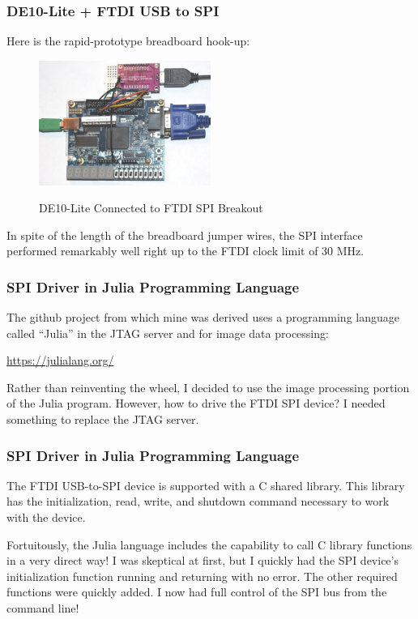 \documentclass{beamer}
\begin{document}
\begin{frame}
\frametitle{DE10-Lite + FTDI USB to SPI}

Here is the rapid-prototype breadboard hook-up:

\begin{figure}[h]
	\centering
	\includegraphics[width=0.5\textwidth]{graphics/de10_spi}
	\centering\bfseries
	\caption{DE10-Lite Connected to FTDI SPI Breakout}
\end{figure}

In spite of the length of the breadboard jumper wires, the SPI interface performed remarkably well right up to the FTDI clock limit of 30 MHz.

\end{frame}

\begin{frame}
\frametitle{SPI Driver in Julia Programming Language}

The github project from which mine was derived uses a programming language called ``Julia'' in the JTAG server and for image data processing:

\url{https://julialang.org/}

Rather than reinventing the wheel, I decided to use the image processing portion of the Julia program.
However, how to drive the FTDI SPI device?  I needed something to replace the JTAG server.

\end{frame}

\begin{frame}
\frametitle{SPI Driver in Julia Programming Language}

The FTDI USB-to-SPI device is supported with a C shared library.  This library has the initialization, read, write, and shutdown
command necessary to work with the device.

Fortuitously, the Julia language includes the capability to call C library functions in a very direct way!
I was skeptical at first, but I quickly had the SPI device's initialization function running and returning with no error.
The other required functions were quickly added.  I now had full control of the SPI bus from the command line!

\end{frame}
\end{document}
